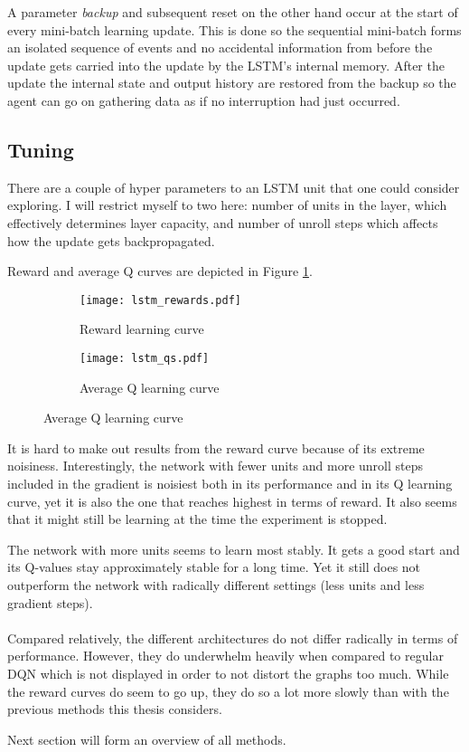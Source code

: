 A parameter \textit{backup} and subsequent reset
on the other hand
occur at the start of every mini-batch learning update.
This is done so the sequential mini-batch
forms an isolated sequence of events
and no accidental information from before the update gets carried into the update
by the LSTM's internal memory.
After the update
the internal state and output history
are restored from the backup
so the agent can go on gathering data
as if no interruption had just occurred.

\subsection{Tuning}
\label{sub:lstm_tuning}
There are a couple of hyper parameters to an LSTM unit
that one could consider exploring.
I will restrict myself to two here:
number of units in the layer,
which effectively determines layer capacity,
and number of unroll steps
which affects
how the update gets backpropagated.

Reward and average Q curves are depicted in Figure \ref{fig:lstm_both}.

\begin{figure}[htpb]
  \centering
  \begin{subfigure}[t]{.49\linewidth}
    \caption{Reward learning curve}
    \texttt{[image: lstm\_rewards.pdf]}
  \end{subfigure}
  \begin{subfigure}[t]{.49\linewidth}
    \caption{Average Q learning curve}
    \texttt{[image: lstm\_qs.pdf]}
  \end{subfigure}
  \label{fig:lstm_both}
\end{figure}

It is hard to make out results from the reward curve because
of its extreme noisiness.
Interestingly,
the network with fewer units
and more unroll steps included in the gradient
is noisiest both in its performance
and in its Q learning curve,
yet it is also the one that reaches highest
in terms of reward.
It also seems that it might still be learning
at the time the experiment is stopped.

The network with more units seems to learn most stably.
It gets a good start and its Q-values stay approximately stable
for a long time.
Yet it still does not outperform
the network with radically different settings
(less units and less gradient steps).

\paragraph{}
Compared relatively,
the different architectures do not differ radically
in terms of performance.
However,
they do underwhelm heavily
when compared to regular DQN
which is not displayed in order to not distort the graphs too much.
While the reward curves do seem to go up,
they do so a lot more slowly
than with the previous methods
this thesis considers.

Next section will form an overview of all methods.
